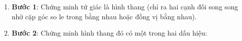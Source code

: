 \begin{enumerate}
\item \textbf{Bước 1}: Chứng minh tứ giác là hình thang (chỉ ra hai cạnh đối song song nhờ cặp góc so le trong bằng nhau hoặc đồng vị bằng nhau).
\item \textbf{Bước 2}: Chứng minh hình thang đó có một trong hai dấu hiệu:
\end{enumerate}
